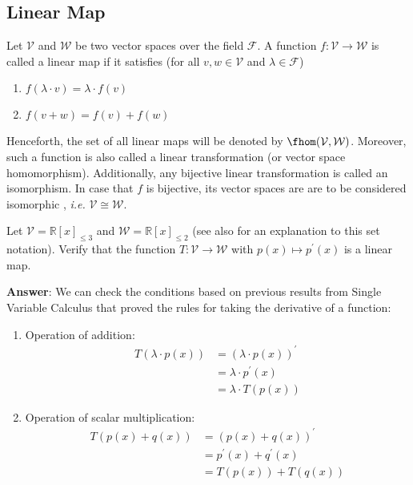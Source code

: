 \subsection{Linear Map}\label{subsec-linear-maps}

\begin{definition}\label{def-linear-maps}
	Let $\mathcal{V}$ and $\mathcal{W}$ be two vector spaces over the field $\mathcal{F}$.
	A function $f:\mathcal{V}\to\mathcal{W}$ is called a linear map if it satisfies
	(for all $v,w\in\mathcal{V}$ and $\lambda\in\mathcal{F}$)
	\begin{enumerate}
		\item $f(\lambda\cdot v)=\lambda\cdot f(v)$
		\item $f(v+w)=f(v)+f(w)$
	\end{enumerate}
\end{definition}

\begin{rem}\label{rem-linear-maps}
	Henceforth, the set of all linear maps will be denoted by $\fhom(\mathcal{V},\mathcal{W})$.
	Moreover, such a function is also called a linear transformation (or vector
	space homomorphism). Additionally, any bijective linear transformation is called
	an isomorphism. In case that $f$ is bijective, its vector spaces are are to
	be considered isomorphic \cite[p.141]{liesenMehrmann2015}, \textit{i.e.}
	$\mathcal{V}\cong\mathcal{W}$.
\end{rem}

\begin{exm}\label{exm-derivative-map}
	Let $\mathcal{V}=\mathbb{R}[x]_{\leq3}$ and $\mathcal{W}=\mathbb{R}[x]_{\leq2}$
	(see also  for an explanation to
	this set notation). Verify that the function $T:\mathcal{V}\to\mathcal{W}$ with
	$p(x)\mapsto p^\prime(x)$ is a linear map.
	\begin{flushleft}
		\textbf{Answer}: We can check the conditions based on previous results
		from Single Variable Calculus that proved the rules for taking the
		derivative of a function:
		\begin{enumerate}
			\item Operation of addition:
			      \begin{align*}
				      T(\lambda\cdot p(x)) & =(\lambda\cdot p(x))^\prime \\
				                           & =\lambda\cdot p^\prime(x)   \\
				                           & =\lambda\cdot T(p(x))
			      \end{align*}
			\item Operation of scalar multiplication:
			      \begin{align*}
				      T(p(x)+q(x)) & =(p(x)+q(x))^\prime      \\
				                   & =p^\prime(x)+q^\prime(x) \\
				                   & =T(p(x))+T(q(x))
			      \end{align*}
		\end{enumerate}
	\end{flushleft}
\end{exm}

